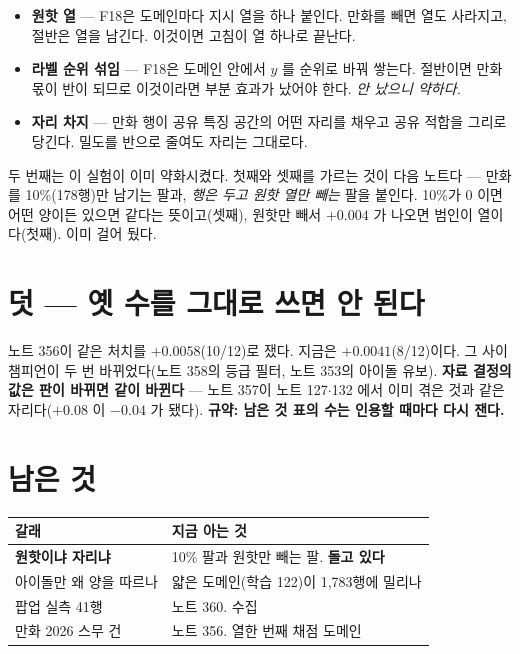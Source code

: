 \documentclass[11pt]{article}
\begin{document}
\begin{itemize}
\item \textbf{원핫 열} --- F18은 도메인마다 지시 열을 하나 붙인다. 만화를
빼면 열도 사라지고, 절반은 열을 남긴다. 이것이면 고침이 열 하나로 끝난다.
\item \textbf{라벨 순위 섞임} --- F18은 도메인 안에서 $y$ 를 순위로 바꿔
쌓는다. 절반이면 만화 몫이 반이 되므로 이것이라면 부분 효과가 났어야
한다. \emph{안 났으니 약하다.}
\item \textbf{자리 차지} --- 만화 행이 공유 특징 공간의 어떤 자리를
채우고 공유 적합을 그리로 당긴다. 밀도를 반으로 줄여도 자리는 그대로다.
\end{itemize}

두 번째는 이 실험이 이미 약화시켰다. 첫째와 셋째를 가르는 것이 다음
노트다 --- 만화를 10\%(178행)만 남기는 팔과, \emph{행은 두고 원핫 열만
빼는} 팔을 붙인다. 10\%가 0 이면 어떤 양이든 있으면 같다는 뜻이고(셋째),
원핫만 빼서 $+0.004$ 가 나오면 범인이 열이다(첫째). 이미 걸어 뒀다.

\section{덧 --- 옛 수를 그대로 쓰면 안 된다}

노트 356이 같은 처치를 $+0.0058$(10/12)로 쟀다. 지금은 $+0.0041$(8/12)이다.
그 사이 챔피언이 두 번 바뀌었다(노트 358의 등급 필터, 노트 353의 아이돌
유보). \textbf{자료 결정의 값은 판이 바뀌면 같이 바뀐다} --- 노트 357이
노트 127$\cdot$132 에서 이미 겪은 것과 같은 자리다($+0.08$ 이 $-0.04$ 가
됐다). \textbf{규약: 남은 것 표의 수는 인용할 때마다 다시 잰다.}

\section{남은 것}

\begin{center}
\begin{tabular}{ll}
\hline
갈래 & 지금 아는 것 \\
\hline
\textbf{원핫이냐 자리냐} & 10\% 팔과 원핫만 빼는 팔. \textbf{돌고 있다} \\
아이돌만 왜 양을 따르나 & 얇은 도메인(학습 122)이 1,783행에 밀리나 \\
팝업 실측 41행 & 노트 360. 수집 \\
만화 2026 스무 건 & 노트 356. 열한 번째 채점 도메인 \\
\hline
\end{tabular}
\end{center}
\end{document}
